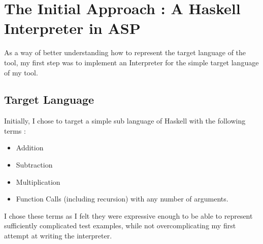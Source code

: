 \chapter{The Initial Approach : A Haskell Interpreter in ASP}

As a way of better understanding how to represent the target language of the tool, my first step was to implement an Interpreter for the simple target language of my tool.

\section{Target Language}

Initially, I chose to target a simple sub language of Haskell with the following terms :

\begin{itemize}
\item Addition
\item Subtraction
\item Multiplication
\item Function Calls (including recursion) with any number of arguments.
\end{itemize}

I chose these terms as I felt they were expressive enough to be able to represent sufficiently complicated test examples, while not overcomplicating my first attempt at writing the interpreter. 

